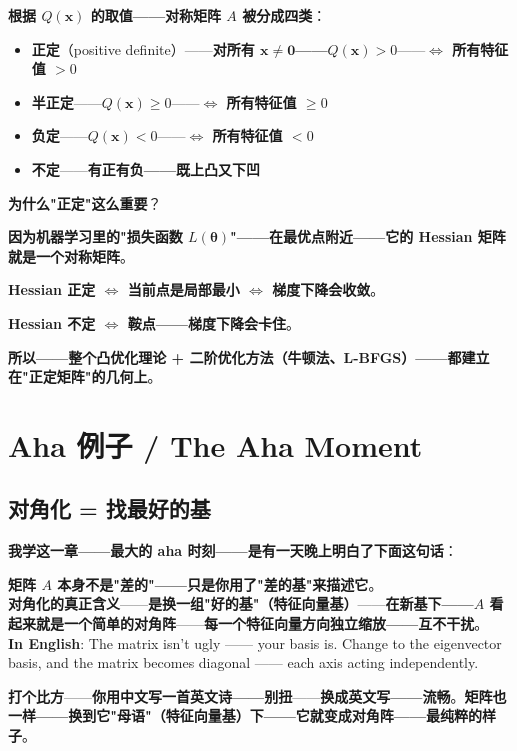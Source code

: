 \textbf{根据 $Q(\bm{x})$ 的取值——对称矩阵 $A$ 被分成四类}：

\begin{itemize}
\item \textbf{正定}（positive definite）——\textbf{对所有 $\bm{x}\neq \bm{0}$——$Q(\bm{x}) > 0$}——\textbf{$\iff$ 所有特征值 $> 0$}
\item \textbf{半正定}——\textbf{$Q(\bm{x}) \geq 0$}——\textbf{$\iff$ 所有特征值 $\geq 0$}
\item \textbf{负定}——\textbf{$Q(\bm{x}) < 0$}——\textbf{$\iff$ 所有特征值 $< 0$}
\item \textbf{不定}——\textbf{有正有负——既上凸又下凹}
\end{itemize}

\textbf{为什么"正定"这么重要}？

\textbf{因为机器学习里的"损失函数 $L(\bm{\theta})$"——在最优点附近——它的 Hessian 矩阵就是一个对称矩阵}。

\textbf{Hessian 正定 $\iff$ 当前点是局部最小 $\iff$ 梯度下降会收敛}。

\textbf{Hessian 不定 $\iff$ 鞍点——梯度下降会卡住}。

\textbf{所以——整个凸优化理论 + 二阶优化方法（牛顿法、L-BFGS）——都建立在"正定矩阵"的几何上}。

\section{Aha 例子 / The Aha Moment}

\subsection{对角化 = 找最好的基}

\textbf{我学这一章——最大的 aha 时刻——是有一天晚上明白了下面这句话}：

\begin{tcolorbox}[ahabox={Aha 时刻}]
\textbf{矩阵 $A$ 本身不是"差的"——只是\textbf{你用了"差的基"来描述它}}。\\[4pt]
\textbf{对角化的真正含义}——\textbf{是换一组"好的基"（特征向量基）}——\textbf{在新基下——$A$ 看起来就是一个简单的对角阵}——\textbf{每一个特征向量方向独立缩放——互不干扰}。\\[4pt]
\textbf{In English}: The matrix isn't ugly —— your basis is. Change to the eigenvector basis, and the matrix becomes diagonal —— each axis acting independently.
\end{tcolorbox}

\textbf{打个比方}——\textbf{你用中文写一首英文诗——别扭}——\textbf{换成英文写——流畅}。\textbf{矩阵也一样——换到它"母语"（特征向量基）下——它就变成对角阵——最纯粹的样子}。

